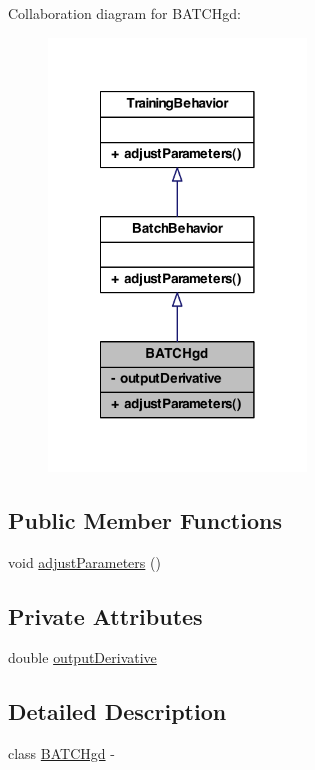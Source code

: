 Collaboration diagram for BATCHgd:
\nopagebreak
\begin{figure}[H]
\begin{center}
\leavevmode
\includegraphics[width=194pt]{class_b_a_t_c_hgd__coll__graph}
\end{center}
\end{figure}
\subsection*{Public Member Functions}
\begin{DoxyCompactItemize}
\item 
void \hyperlink{class_b_a_t_c_hgd_af595488bdd12a46087edbdab0385251a}{adjustParameters} ()
\end{DoxyCompactItemize}
\subsection*{Private Attributes}
\begin{DoxyCompactItemize}
\item 
double \hyperlink{class_b_a_t_c_hgd_a4668a2e34a1323212a71c3aaf378a10d}{outputDerivative}
\end{DoxyCompactItemize}


\subsection{Detailed Description}
class \hyperlink{class_b_a_t_c_hgd}{BATCHgd} -\/ 

